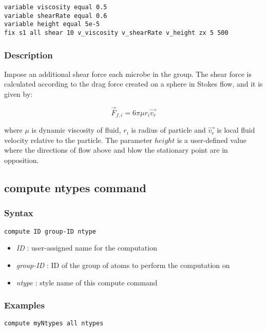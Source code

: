 \documentclass[11pt,a4paper,openright]{article}
\begin{document}
\begin{Verbatim}[frame=single]
variable viscosity equal 0.5
variable shearRate equal 0.6
variable height equal 5e-5
fix s1 all shear 10 v_viscosity v_shearRate v_height zx 5 500
\end{Verbatim}

\subsubsection*{Description}
Impose an additional shear force each microbe in the group. 
The shear force is calculated according to the drag force created on a sphere in Stokes flow,
and it is given by:

\[ \overrightarrow{F}_{f, i} = 6 \pi \mu r_{i}  \overrightarrow{v_r}\] 

where $\mu$ is dynamic viscosity of fluid, $r_i$ is radius of particle and 
$\overrightarrow{v_r}$ is local fluid velocity relative to the particle.
The parameter $height$ is a user-defined value where the directions of flow above and 
blow the stationary point are in opposition.

\newpage
\subsection{compute ntypes command}
\label{cntypes}   

  \subsubsection*{Syntax}
\begin{Verbatim}[frame=single]
compute ID group-ID ntype
\end{Verbatim}

\begin{itemize}  [nosep]
\item
	{\it ID }: user-assigned name for the computation
\item
	{\it group-ID }: ID of the group of atoms to perform the computation on
\item
	{\it ntype }: style name of this compute command
\end{itemize}

\subsubsection*{Examples}

\begin{Verbatim}[frame=single]
compute myNtypes all ntypes
\end{Verbatim}
\end{document}
